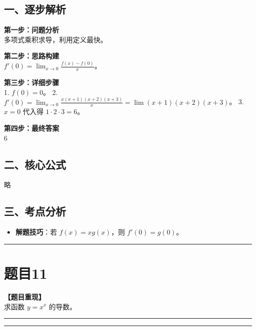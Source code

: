 \documentclass[12pt, a4paper]{ctexart}
\newcommand{\TopSeparator}{
    \par\noindent\rule{\textwidth}{1.5pt}\vspace{0.5em} %
}
\newcommand{\AnalysisSeparator}{
    \par\noindent\rule{\textwidth}{0.5pt}\vspace{0.2em}\hrule\vspace{0.5em} %
}
\newenvironment{RedAnalysis}{
    \par
    \color{red} %
}{
    \par
    \color{black} %
}
\begin{document}
\begin{RedAnalysis}

\subsection*{一、逐步解析}

\textbf{第一步：问题分析} \\
多项式乘积求导，利用定义最快。

\textbf{第二步：思路构建} \\
$f'(0) = \lim_{x\to 0} \frac{f(x)-f(0)}{x}$。

\textbf{第三步：详细步骤} \\
1. $f(0) = 0$。
2. $f'(0) = \lim_{x\to 0} \frac{x(x+1)(x+2)(x+3)}{x} = \lim (x+1)(x+2)(x+3)$。
3. $x=0$ 代入得 $1 \cdot 2 \cdot 3 = 6$。

\textbf{第四步：最终答案} \\
6

\subsection*{二、核心公式}
略

\subsection*{三、考点分析}
\begin{itemize}
    \item \textbf{解题技巧}：若 $f(x) = xg(x)$，则 $f'(0) = g(0)$。
\end{itemize}

\end{RedAnalysis}

\vspace{2em}

\TopSeparator
\section*{题目11}

\textbf{【题目重现】} \\
求函数 $ y = x^{x} $ 的导数。

\AnalysisSeparator
\end{document}
